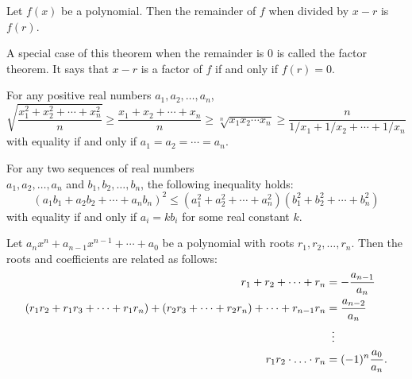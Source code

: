 \begin{theorem}
    \label{thm: remainder}
    Let $f(x)$ be a polynomial. Then the remainder of $f$ when divided by $x -
    r$ is $f(r)$.

    A special case of this theorem when the remainder is 0 is called the factor
    theorem. It says that $x - r$ is a factor of $f$ if and only if $f(r) = 0$.
\end{theorem}
\begin{theorem}
    \label{thm: amgm}
    For any positive real numbers $a_1, a_2, \ldots, a_n$,
    \[\sqrt{\frac{x_1^2 + x_2^2 + \cdots + x_n^2}{n}} \geq \frac{x_1 + x_2 + \cdots + x_n}{n} \geq \sqrt[n]{x_1 x_2 \cdots x_n} \geq \frac{n}{1/x_1 + 1/x_2 + \cdots + 1/x_n}\]
    with equality if and only if $a_1 = a_2 = \cdots = a_n$.
\end{theorem}

\begin{theorem}
    \label{thm: cs}
    For any two sequences of real numbers\\ $a_1, a_2, \ldots, a_n$ and $b_1, b_2, \ldots, b_n$, the following inequality holds:
    \[ (a_1 b_1 + a_2 b_2 + \cdots + a_n b_n)^2 \leq (a_1^2 + a_2^2 + \cdots + a_n^2)(b_1^2 + b_2^2 + \cdots +b_n^2) \]
    with equality if and only if $a_i = kb_i$ for some real constant $k$.
\end{theorem}

\begin{theorem}
    \label{thm: vieta}
    Let $a_{n}x^{n}+a_{n-1}x^{n-1}+\cdots + a_{0}$ be a polynomial with roots $r_{1},r_{2},\ldots,r_{n}$. Then the roots and coefficients are related as follows:
    \begin{align*}
        r_{1}+r_{2}+\cdots+r_{n}&=-\frac{a_{n-1}}{a_{n}}\\
        (r_{1}r_{2}+r_{1}r_{3}+\cdots+r_{1}r_{n})+(r_{2}r_{3}+\cdots+r_{2}r_{n})+\cdots+r_{n-1}r_{n}&=\frac{a_{n-2}}{a_{n}}\\
        &\vdotswithin{=}\\
        r_{1}r_{2}\cdot \ldots \cdot r_{n}&=(-1)^{n}\frac{a_{0}}{a_{n}}.
    \end{align*}
\end{theorem}

